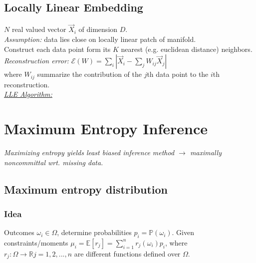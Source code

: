 \documentclass[9pt,parskip]{scrartcl}
\begin{document}
\begin{multicols*}{4}
\subsection*{Locally Linear Embedding}
$N$ real valued vector $\vec{X}_i $ of dimension $D$.\\
\textit{Assumption: } data lies close on locally linear patch of manifold. \\
Construct each data point form its $K$ nearest (e.g. euclidean distance) neighbors. \\
\textit{Reconstruction error: }$\mathcal{E} (W) = \sum_i |\vec{X}_i -  \sum_j W_{ij} \vec{X}_j|$ \\
where $W_{ij}$ summarize the contribution of the $j$th data point to
the $i$th reconstruction. \\
\underline{\textit{LLE Algorithm: }} \\
\section*{Maximum Entropy Inference}
\textit{Maximizing entropy yields least biased inference method $\to$ maximally noncommittal wrt. missing data. }
\subsection*{Maximum entropy distribution}
\subsubsection*{Idea}
Outcomes $\omega_i \in \Omega$, determine probabilities $p_i = \mathbb{P}(\omega_i)$.
Given constraints/moments $\mu_i = \mathbb{E}[r_j] = \sum_{i=1}^n r_j(\omega_i)p_i$, where $r_j : \Omega \to \mathbb{R} j = 1, 2, ..., n$ are different functions defined over $\Omega$. 

\end{multicols*}
\end{document}
